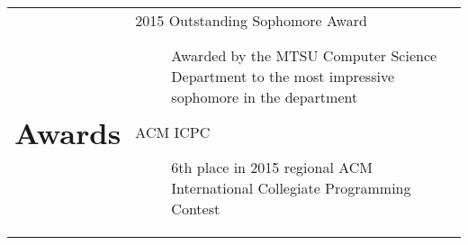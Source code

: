 \documentclass[10pt]{article} %
\begin{document}
\begin{tabularx}{\textwidth}{p{3cm} X}
\section*{Awards} & 
\begin{description}
    \item[2015 Outstanding Sophomore Award] Awarded by the MTSU Computer Science Department to the most impressive sophomore in the department
    \item[ACM ICPC] 6th place in 2015 regional ACM International Collegiate Programming Contest
\end{description}


\end{tabularx}
\end{document}

